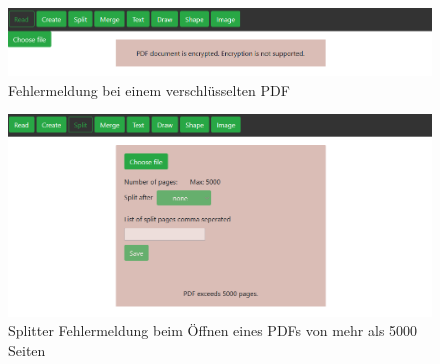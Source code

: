 \begin{figure}[!htbp]
	\centering
	\includegraphics[width=1\textwidth]{"images/errorcrypt.png"}
	\caption{Fehlermeldung bei einem verschlüsselten PDF}
	\label{fig:errorcrypt}
\end{figure}

\begin{figure}[!htbp]
	\centering
	\includegraphics[width=1\textwidth]{"images/errorpages.png"}
	\caption{Splitter Fehlermeldung beim Öffnen eines PDFs von mehr als 5000 Seiten}
	\label{fig:errorpages}
\end{figure}

